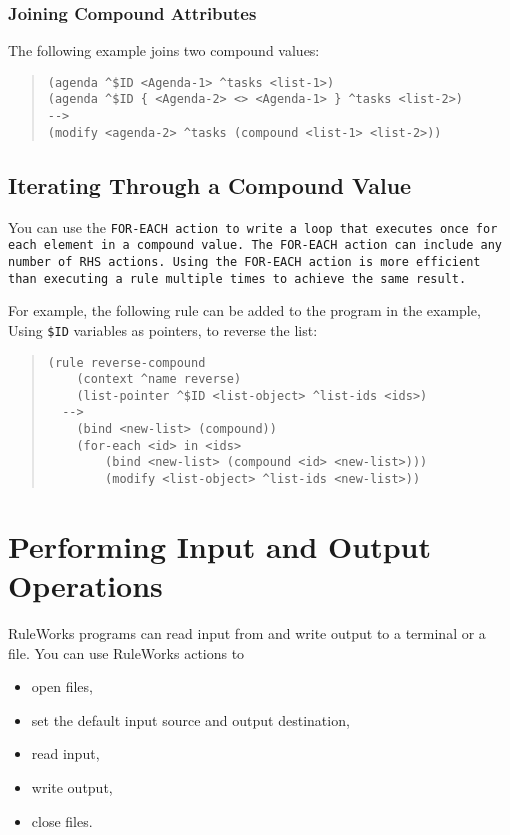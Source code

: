 \subsubsection*{Joining Compound Attributes}

The following example joins two compound values:
\begin{quote}
\begin{verbatim}
(agenda ^$ID <Agenda-1> ^tasks <list-1>)
(agenda ^$ID { <Agenda-2> <> <Agenda-1> } ^tasks <list-2>)
-->
(modify <agenda-2> ^tasks (compound <list-1> <list-2>))
\end{verbatim}
\end{quote}

\subsection{Iterating Through a Compound Value}

You can use the \tt{FOR-EACH} action to write a loop that executes
once for each element in a compound value. The \tt{FOR-EACH} action
can include any number of RHS actions. Using the \tt{FOR-EACH} action
is more efficient than executing a rule multiple times to achieve the
same result.

For example, the following rule can be added to the program in the
example, Using \verb|$ID| variables as pointers, to reverse the list:

\begin{quote}
\begin{verbatim}
(rule reverse-compound
    (context ^name reverse)
    (list-pointer ^$ID <list-object> ^list-ids <ids>)
  -->
    (bind <new-list> (compound))
    (for-each <id> in <ids>
        (bind <new-list> (compound <id> <new-list>)))
        (modify <list-object> ^list-ids <new-list>))
\end{verbatim}
\end{quote}

\section{Performing Input and Output Operations}

RuleWorks programs can read input from and
write output to a terminal or a file. You can
use RuleWorks actions to

\begin{itemize}
\item open files,
\item set the default input source and output destination,
\item read input,
\item write output,
\item close files.
\end{itemize}

